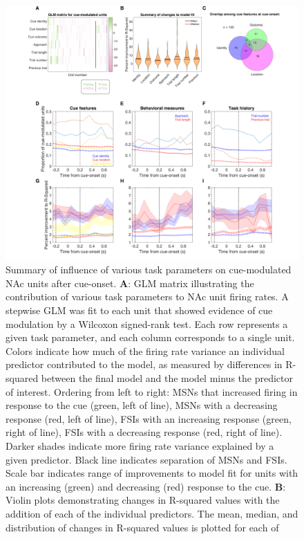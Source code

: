 \documentclass[11pt]{article}
\newcommand{\bsf}[1]{\textbf{#1}}
\begin{document}
\begin{figure}[h]
\centering
\includegraphics[height=0.5\textheight]{Fig 6 - GLM.png}
\caption{Summary of influence of various task parameters on cue-modulated NAc
units after cue-onset. \bsf{A}: GLM matrix illustrating the contribution of
various task parameters to NAc unit firing rates. A stepwise GLM was fit to
each unit that showed evidence of cue modulation by a Wilcoxon signed-rank
test. Each row represents a given task parameter, and each column corresponds
to a single unit. Colors indicate how much of the firing rate variance an
individual predictor contributed to the model, as measured by differences in
R-squared between the final model and the model minus the predictor of
interest. Ordering from left to right: MSNs that increased firing in response
to the cue (green, left of line), MSNs with a decreasing response (red, left
of line), FSIs with an increasing response (green, right of line), FSIs with a
decreasing response (red, right of line). Darker shades indicate more firing
rate variance explained by a given predictor. Black line indicates separation
of MSNs and FSIs. Scale bar indicates range of improvements to model fit for units with an increasing (green) and decreasing (red) response to the cue. \bsf{B}: Violin plots demonstrating changes in R-squared
values with the addition of each of the individual predictors. The mean,
median, and distribution of changes in R-squared values is plotted for each of
}
\end{figure}
\end{document}
